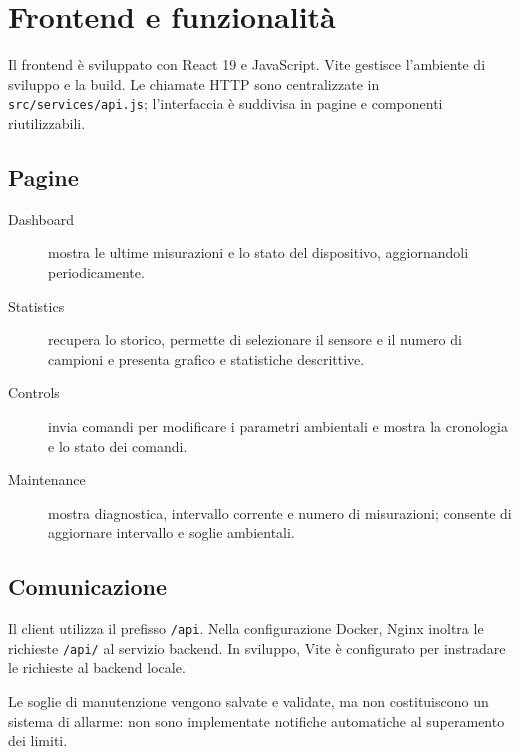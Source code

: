 \chapter{Frontend e funzionalità}

Il frontend è sviluppato con React 19 e JavaScript. Vite gestisce l'ambiente di sviluppo e la build. Le chiamate HTTP sono centralizzate in \texttt{src/services/api.js}; l'interfaccia è suddivisa in pagine e componenti riutilizzabili.

\section{Pagine}
\begin{description}
    \item[Dashboard] mostra le ultime misurazioni e lo stato del dispositivo, aggiornandoli periodicamente.
    \item[Statistics] recupera lo storico, permette di selezionare il sensore e il numero di campioni e presenta grafico e statistiche descrittive.
    \item[Controls] invia comandi per modificare i parametri ambientali e mostra la cronologia e lo stato dei comandi.
    \item[Maintenance] mostra diagnostica, intervallo corrente e numero di misurazioni; consente di aggiornare intervallo e soglie ambientali.
\end{description}

\section{Comunicazione}
Il client utilizza il prefisso \texttt{/api}. Nella configurazione Docker, Nginx inoltra le richieste \texttt{/api/} al servizio backend. In sviluppo, Vite è configurato per instradare le richieste al backend locale.

Le soglie di manutenzione vengono salvate e validate, ma non costituiscono un sistema di allarme: non sono implementate notifiche automatiche al superamento dei limiti.
